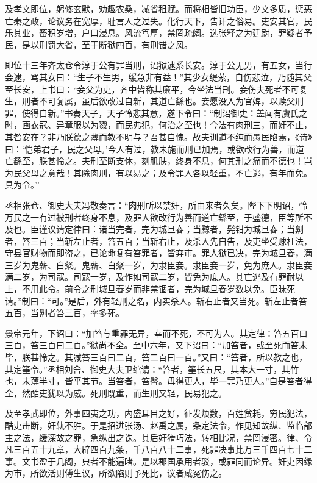 \documentclass[]{article}
\begin{document}
及孝文即位，躬修玄默，劝趣农桑，减省租赋。而将相皆旧功臣，少文多质，惩恶亡秦之政，论议务在宽厚，耻言人之过失。化行天下，告讦之俗易。吏安其官，民乐其业，畜积岁增，户口浸息。风流笃厚，禁罔疏阔。选张释之为廷尉，罪疑者予民，是以刑罚大省，至于断狱四百，有刑错之风。

即位十三年齐太仓令淳于公有罪当刑，诏狱逮系长安。淳于公无男，有五女，当行会逮，骂其女曰：``生子不生男，缓急非有益！''其少女缇萦，自伤悲泣，乃随其父至长安，上书曰：``妾父为吏，齐中皆称其廉平，今坐法当刑。妾伤夫死者不可复生，刑者不可复属，虽后欲改过自新，其道亡繇也。妾愿没入为官婢，以赎父刑罪，使得自新。''书奏天子，天子怜悲其意，遂下令曰：``制诏御史：盖闻有虞氏之时，画衣冠、异章服以为戮，而民弗犯，何治之至也！今法有肉刑三，而奸不止，其咎安在？非乃朕德之薄而教不明与？吾甚自愧。故夫训道不纯而愚民陷焉，《诗》曰：`恺弟君子，民之父母。'今人有过，教未施而刑已加焉，或欲改行为善，而道亡繇至，朕甚怜之。夫刑至断支休，刻肌肤，终身不息，何其刑之痛而不德也！岂为民父母之意哉！其除肉刑，有以易之；及令罪人各以轻重，不亡逃，有年而免。具为令。''

丞相张仓、御史大夫冯敬奏言：``肉刑所以禁奸，所由来者久矣。陛下下明诏，怜万民之一有过被刑者终身不息，及罪人欲改行为善而道亡繇至，于盛德，臣等所不及也。臣谨议请定律曰：诸当完者，完为城旦舂；当黥者，髡钳为城旦舂；当劓者，笞三百；当斩左止者，笞五百；当斩右止，及杀人先自告，及吏坐受赇枉法，守县官财物而即盗之，已论命复有笞罪者，皆弃市。罪人狱已决，完为城旦舂，满三岁为鬼薪、白粲。鬼薪、白粲一岁，为隶臣妾。隶臣妾一岁，免为庶人。隶臣妾满二岁，为司寇。司寇一岁，及作如司寇二岁，皆免为庶人。其亡逃及有罪耐以上，不用此令。前令之刑城旦舂岁而非禁锢者，完为城旦舂岁数以免。臣昧死请。''制曰：``可。''是后，外有轻刑之名，内实杀人。斩右止者又当死。斩左止者笞五百，当劓者笞三百，率多死。

景帝元年，下诏曰：``加笞与重罪无异，幸而不死，不可为人。其定律：笞五百曰三百，笞三百曰二百。''狱尚不全。至中六年，又下诏曰：``加笞者，或至死而笞未毕，朕甚怜之。其减笞三百曰二百，笞二百曰一百。''又曰：``笞者，所以教之也，其定箠令。''丞相刘舍、御史大夫卫绾请：``笞者，箠长五尺，其本大一寸，其竹也，末薄半寸，皆平其节。当笞者，笞臀。毋得更人，毕一罪乃更人。''自是笞者得全，然酷吏犹以为威。死刑既重，而生刑又轻，民易犯之。

及至孝武即位，外事四夷之功，内盛耳目之好，征发烦数，百姓贫耗，穷民犯法，酷吏击断，奸轨不胜。于是招进张汤、赵禹之属，条定法令，作见知故纵、监临部主之法，缓深故之罪，急纵出之诛。其后奸猾巧法，转相比况，禁罔浸密。律、令凡三百五十九章，大辟四百九条，千八百八十二事，死罪决事比万三千四百七十二事。文书盈于几阁，典者不能遍睹。是以郡国承用者驳，或罪同而论异。奸吏因缘为市，所欲活则傅生议，所欲陷则予死比，议者咸冤伤之。
\end{document}
